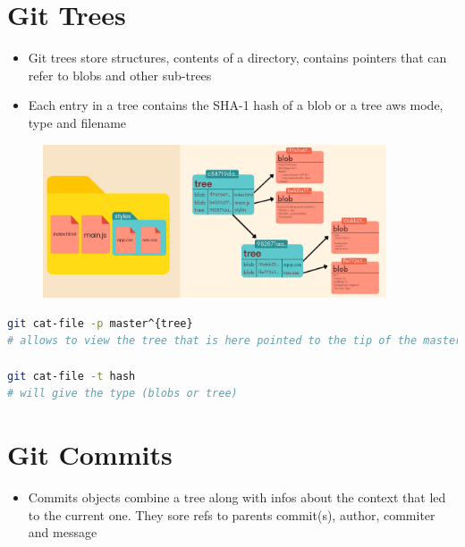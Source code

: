 \documentclass{report}
\begin{document}
\section{Git Trees}

\begin{itemize}
	\item Git trees store structures, contents of a directory, contains pointers that can refer to blobs and other sub-trees 
	\item Each entry in a tree contains the SHA-1 hash of a blob or a tree aws mode, type and filename
\end{itemize}

\begin{figure}[H] 
	 \centering 
	 \includegraphics[width=4in]{screenshots/2022-07-10T17-18-43Z.png} 
\end{figure}

\begin{tcolorbox}[title=Viewing Trees,colback=backcolour]
\begin{lstlisting}[language=bash]
git cat-file -p master^{tree} 
# allows to view the tree that is here pointed to the tip of the master branch

git cat-file -t hash
# will give the type (blobs or tree)
\end{lstlisting}
\end{tcolorbox}


\section{Git Commits}

\begin{itemize}
	\item Commits objects combine a tree along with infos about the context that led to the current one. They sore refs to parents commit(s), author, commiter and message
\end{itemize}
\end{document}

